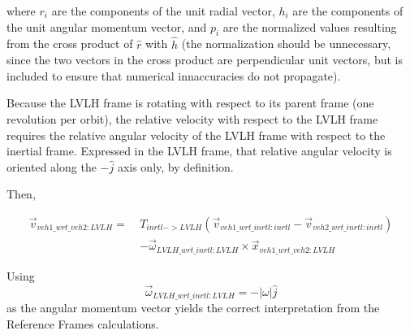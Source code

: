 where $r_i$ are the components of the unit radial vector, $h_i$ are the components of the unit angular momentum vector, and $p_i$ are the normalized values resulting from the cross product of $\hat r$ with $\hat h$  (the normalization should be unnecessary, since the two vectors in the cross product are perpendicular unit vectors, but is included to ensure that numerical innaccuracies do not propagate).

Because the LVLH frame is rotating with respect to its parent frame (one revolution per orbit), the relative velocity with respect to the LVLH frame requires the relative angular velocity of the LVLH frame with respect to the inertial frame.  Expressed in the LVLH frame, that relative angular velocity is oriented along the $-\hat j$ axis only, by definition.

Then,

\begin{equation}
\begin{split}
 \vec v_{veh1\_wrt\_veh2:LVLH} = ~ & T_{inrtl->LVLH} \left( \vec v_{veh1\_wrt\_inrtl:inrtl}
                                                        - \vec v_{veh2\_wrt\_inrtl:inrtl} \right) \\
         & - \vec \omega_{LVLH\_wrt\_inrtl:LVLH} \times \vec x_{veh1\_wrt\_veh2:LVLH} 
\end{split}
\end{equation} 
\label{equ:LVLHvel}

Using 
\begin{equation*}
 \vec \omega_{LVLH\_wrt\_inrtl:LVLH}  = - \lvert \omega \rvert \hat j 
\end{equation*}
as the angular momentum vector yields the correct interpretation from the Reference Frames calculations.


